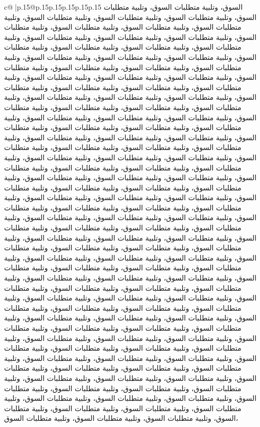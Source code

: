\documentclass{article}
\begin{document}
{\begin{supertabular}{c@{$\;$}|p{.15\linewidth}@{}p{.15\linewidth}p{.15\linewidth}p{.15\linewidth}p{.15\linewidth}p{.15\linewidth}}
{{{السوق، وتلبية متطلبات السوق، وتلبية متطلبات السوق، وتلبية متطلبات السوق، وتلبية متطلبات السوق، وتلبية متطلبات السوق، وتلبية متطلبات السوق، وتلبية متطلبات السوق، وتلبية متطلبات السوق، وتلبية متطلبات السوق، وتلبية متطلبات السوق، وتلبية متطلبات السوق، وتلبية متطلبات السوق، وتلبية متطلبات السوق، وتلبية متطلبات السوق، وتلبية متطلبات السوق، وتلبية متطلبات السوق، وتلبية متطلبات السوق، وتلبية متطلبات السوق، وتلبية متطلبات السوق، وتلبية متطلبات السوق، وتلبية متطلبات السوق، وتلبية متطلبات السوق، وتلبية متطلبات السوق، وتلبية متطلبات السوق، وتلبية متطلبات السوق، وتلبية متطلبات السوق، وتلبية متطلبات السوق، وتلبية متطلبات السوق، وتلبية متطلبات السوق، وتلبية متطلبات السوق، وتلبية متطلبات السوق، وتلبية متطلبات السوق، وتلبية متطلبات السوق، وتلبية متطلبات السوق، وتلبية متطلبات السوق، وتلبية متطلبات السوق، وتلبية متطلبات السوق، وتلبية متطلبات السوق، وتلبية متطلبات السوق، وتلبية متطلبات السوق، وتلبية متطلبات السوق، وتلبية متطلبات السوق، وتلبية متطلبات السوق، وتلبية متطلبات السوق، وتلبية متطلبات السوق، وتلبية متطلبات السوق، وتلبية متطلبات السوق، وتلبية متطلبات السوق، وتلبية متطلبات السوق، وتلبية متطلبات السوق، وتلبية متطلبات السوق، وتلبية متطلبات السوق، وتلبية متطلبات السوق، وتلبية متطلبات السوق، وتلبية متطلبات السوق، وتلبية متطلبات السوق، وتلبية متطلبات السوق، وتلبية متطلبات السوق، وتلبية متطلبات السوق، وتلبية متطلبات السوق، وتلبية متطلبات السوق، وتلبية متطلبات السوق، وتلبية متطلبات السوق، وتلبية متطلبات السوق، وتلبية متطلبات السوق، وتلبية متطلبات السوق، وتلبية متطلبات السوق، وتلبية متطلبات السوق، وتلبية متطلبات السوق، وتلبية متطلبات السوق، وتلبية متطلبات السوق، وتلبية متطلبات السوق، وتلبية متطلبات السوق، وتلبية متطلبات السوق، وتلبية متطلبات السوق، وتلبية متطلبات السوق، وتلبية متطلبات السوق، وتلبية متطلبات السوق، وتلبية متطلبات السوق، وتلبية متطلبات السوق، وتلبية متطلبات السوق، وتلبية متطلبات السوق، وتلبية متطلبات السوق، وتلبية متطلبات السوق، وتلبية متطلبات السوق، وتلبية متطلبات السوق، وتلبية متطلبات السوق، وتلبية متطلبات السوق، وتلبية متطلبات السوق، وتلبية متطلبات السوق، وتلبية متطلبات السوق، وتلبية متطلبات السوق، وتلبية متطلبات السوق، وتلبية متطلبات السوق، وتلبية متطلبات السوق، وتلبية متطلبات السوق، وتلبية متطلبات السوق، وتلبية متطلبات السوق، وتلبية متطلبات السوق، وتلبية متطلبات السوق، وتلبية متطلبات السوق، وتلبية متطلبات السوق، وتلبية متطلبات السوق، وتلبية متطلبات السوق، وتلبية متطلبات السوق، وتلبية متطلبات السوق، وتلبية متطلبات السوق، وتلبية متطلبات السوق، وتلبية متطلبات السوق، وتلبية متطلبات السوق، وتلبية متطلبات السوق، وتلبية متطلبات السوق، وتلبية متطلبات السوق، وتلبية متطلبات السوق، وتلبية متطلبات السوق، وتلبية متطلبات السوق، وتلبية متطلبات السوق، وتلبية متطلبات السوق، وتلبية متطلبات السوق، وتلبية متطلبات السوق، وتلبية متطلبات السوق، وتلبية متطلبات السوق، وتلبية متطلبات السوق، وتلبية متطلبات السوق، وتلبية متطلبات السوق، وتلبية متطلبات السوق، وتلبية متطلبات السوق، وتلبية متطلبات السوق، وتلبية متطلبات السوق، وتلبية متطلبات السوق، وتلبية متطلبات السوق، وتلبية متطلبات السوق، وتلبية متطلبات السوق، وتلبية متطلبات السوق، وتلبية متطلبات السوق، وتلبية متطلبات السوق، وتلبية متطلبات السوق، وتلبية متطلبات السوق، وتلبية متطلبات السوق، وتلبية متطلبات السوق، وتلبية متطلبات السوق، وتلبية متطلبات السوق، وتلبية متطلبات السوق، وتلبية متطلبات السوق، وتلبية متطلبات السوق، }}}
\end{supertabular}}
\end{document}
